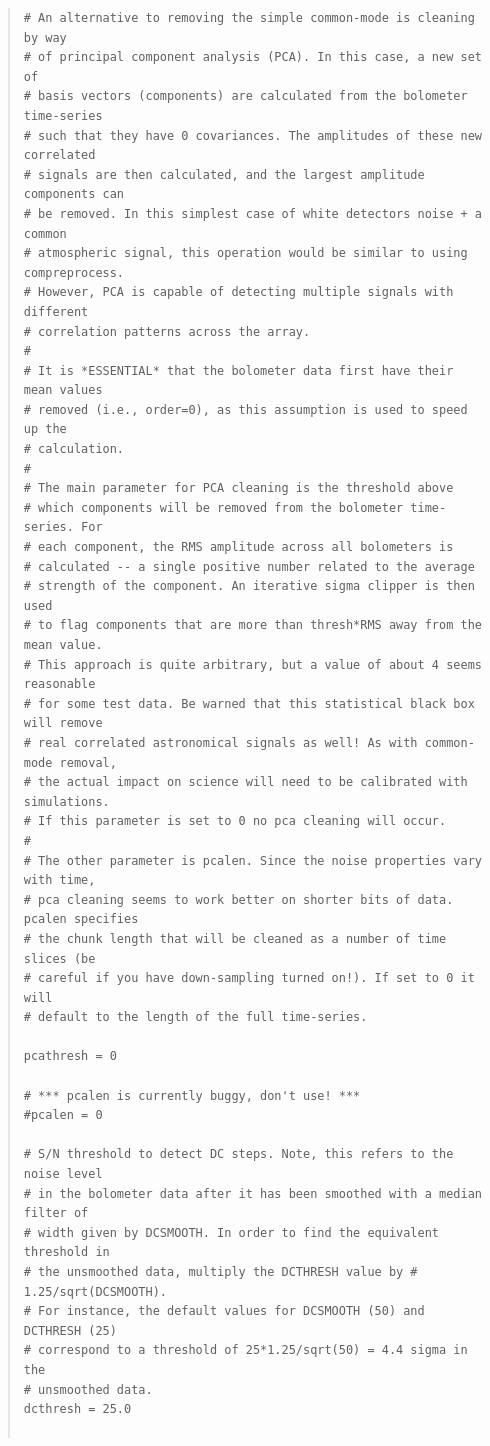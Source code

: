 \documentclass[twoside,11pt]{article}
\newcounter{box}
\renewcommand{\_}{\texttt{\symbol{95}}}
\newenvironment{myquote}{\begin{quote}\begin{small}}{\end{small}\end{quote}}
\begin{document}
\begin{myquote}
\begin{verbatim}
# An alternative to removing the simple common-mode is cleaning by way
# of principal component analysis (PCA). In this case, a new set of
# basis vectors (components) are calculated from the bolometer time-series
# such that they have 0 covariances. The amplitudes of these new correlated
# signals are then calculated, and the largest amplitude components can
# be removed. In this simplest case of white detectors noise + a common
# atmospheric signal, this operation would be similar to using compreprocess.
# However, PCA is capable of detecting multiple signals with different
# correlation patterns across the array.
#
# It is *ESSENTIAL* that the bolometer data first have their mean values
# removed (i.e., order=0), as this assumption is used to speed up the
# calculation.
#
# The main parameter for PCA cleaning is the threshold above
# which components will be removed from the bolometer time-series. For
# each component, the RMS amplitude across all bolometers is
# calculated -- a single positive number related to the average
# strength of the component. An iterative sigma clipper is then used
# to flag components that are more than thresh*RMS away from the mean value.
# This approach is quite arbitrary, but a value of about 4 seems reasonable
# for some test data. Be warned that this statistical black box will remove
# real correlated astronomical signals as well! As with common-mode removal,
# the actual impact on science will need to be calibrated with simulations.
# If this parameter is set to 0 no pca cleaning will occur.
#
# The other parameter is pcalen. Since the noise properties vary with time,
# pca cleaning seems to work better on shorter bits of data. pcalen specifies
# the chunk length that will be cleaned as a number of time slices (be
# careful if you have down-sampling turned on!). If set to 0 it will
# default to the length of the full time-series.

pcathresh = 0

# *** pcalen is currently buggy, don't use! ***
#pcalen = 0

# S/N threshold to detect DC steps. Note, this refers to the noise level
# in the bolometer data after it has been smoothed with a median filter of
# width given by DCSMOOTH. In order to find the equivalent threshold in
# the unsmoothed data, multiply the DCTHRESH value by # 1.25/sqrt(DCSMOOTH).
# For instance, the default values for DCSMOOTH (50) and DCTHRESH (25)
# correspond to a threshold of 25*1.25/sqrt(50) = 4.4 sigma in the
# unsmoothed data.
dcthresh = 25.0


\end{verbatim}
\end{myquote}
\end{document}
